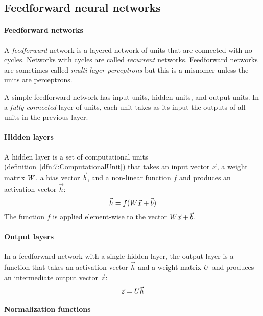 \subsection{Feedforward neural networks}

\paragraph{Feedforward networks}

A \textit{feedforward} network is a layered network of units that are connected
with no cycles.
Networks with cycles are called \textit{recurrent} networks.
Feedforward networks are sometimes called \textit{multi-layer perceptrons} but
this is a misnomer unless the units are perceptrons.

A simple feedforward network has input units, hidden units, and output units.
In a \textit{fully-connected} layer of units, each unit takes as its input the
outputs of all units in the previous layer.

\paragraph{Hidden layers}

A hidden layer is a set of computational units
(definition~\ref{dfn:7:ComputationalUnit}) that takes an input vector
$\vec{x}$, a weight matrix $W$, a bias vector $\vec{b}$, and a
non-linear function $f$ and produces an activation vector $\vec{h}$:
\begin{equation}
  \vec{h} = f(W \vec{x} + \vec{b})
\end{equation}
The function $f$ is applied element-wise to the vector
$W \vec{x} + \vec{b}$.

\paragraph{Output layers}

In a feedforward network with a single hidden layer, the output layer is a
function that takes an activation vector $\vec{h}$ and a weight matrix
$U$ and produces an intermediate output vector $\vec{z}$:
\begin{equation}
  \vec{z} = U \vec{h}
\end{equation}

\paragraph{Normalization functions}


